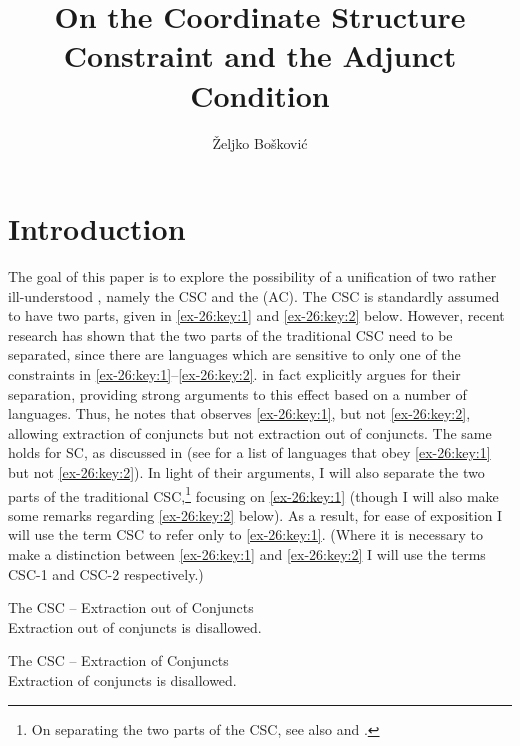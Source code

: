 \documentclass[output=paper]{langsci/langscibook}
\author{Željko Bošković\affiliation{University of Connecticut}}
\title{On the Coordinate Structure Constraint and the Adjunct Condition}
\begin{document}
\glsresetall


\section{Introduction}

The goal of this paper is to explore the possibility of a unification of two
rather ill-understood , namely the \gls{CSC} and the  (AC). The \gls{CSC} is standardly assumed to have two parts, given in \eqref{ex-26:key:1} and
\eqref{ex-26:key:2} below.  However, recent research has shown that the two parts of the
traditional \gls{CSC} need to be separated,
since there are languages which are sensitive to only one of the constraints in
\eqref{ex-26:key:1}--\eqref{ex-26:key:2}. \textcite{Odainpress} in fact explicitly argues for their separation,
providing strong arguments to this effect based on a number of languages. Thus,
he notes that  observes \eqref{ex-26:key:1}, but not \eqref{ex-26:key:2}, allowing extraction of
conjuncts but not extraction out of conjuncts. The same holds for \gls{SC}, as
discussed in \textcite{Stjepanovic2014} (see \citealt{Odainpress} for a list of
languages that obey \eqref{ex-26:key:1} but not \eqref{ex-26:key:2}). In light of their arguments, I will also
separate the two parts of the traditional \gls{CSC},\footnote{On separating the two parts of the
\gls{CSC}, see also \citet{Grosu1973} and
\citet{Postal1998}.} focusing on \eqref{ex-26:key:1} (though I will also make some remarks
regarding \eqref{ex-26:key:2} below).  As a result, for ease of exposition I will use the term
\gls{CSC} to refer only to \eqref{ex-26:key:1}. (Where it
is necessary to make a distinction between \eqref{ex-26:key:1} and \eqref{ex-26:key:2} I will use the terms
CSC-1 and CSC-2 respectively.)

\ea\label{ex-26:key:1}The \glsdesc{CSC} -- Extraction out of Conjuncts\\
	Extraction out of conjuncts is disallowed.
\z

\ea\label{ex-26:key:2}The \glsdesc{CSC} – Extraction of Conjuncts\\
	Extraction of conjuncts is disallowed.
\z
\end{document}
